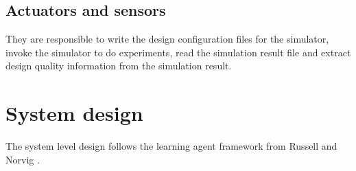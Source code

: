 \documentclass[12pt]{article}
\theoremstyle{definition}
\begin{document}
\subsection{Actuators and sensors}
They are responsible to write the design configuration files for the simulator, invoke the simulator to do experiments, read the simulation result file and extract design quality information from the simulation result.

\section{System design}
The system level design follows the learning agent framework from Russell and Norvig \cite{russell1995modern}.
\end{document}
